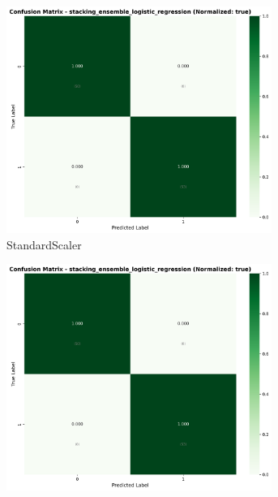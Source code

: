 \begin{figure}[H]\centering
\begin{subfigure}[b]{0.31\textwidth}\centering
\includegraphics[width=0.95\textwidth]{Result/heart_dataset/confusion_matrices/stacking_ensemble_logistic_regression_numeric_dataset_StandardScaler.png}
\caption{StandardScaler}\label{fig:stacking_heart_cm_standard}
\end{subfigure}\hfill
\begin{subfigure}[b]{0.31\textwidth}\centering
\includegraphics[width=0.95\textwidth]{Result/heart_dataset/confusion_matrices/stacking_ensemble_logistic_regression_numeric_dataset_MinMaxScaler.png}

\end{subfigure}
\end{figure}
